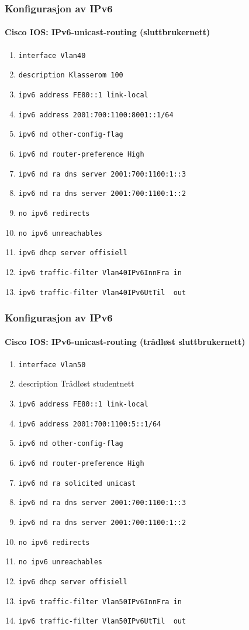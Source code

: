\begin{frame}%
  \frametitle{Konfigurasjon av IPv6}
  \framesubtitle{Cisco IOS: IPv6-unicast-routing (sluttbrukernett)}
  \begin{enumerate}%
  \item \alert{\texttt{interface Vlan40}}
  \item \texttt{description Klasserom 100}
  \item \alert{\texttt{ipv6 address FE80::1 link-local}}
  \item \alert{\texttt{ipv6 address 2001:700:1100:8001::1/64}}
  \item \alert{\texttt{ipv6 nd other-config-flag}}
  \item \alert{\texttt{ipv6 nd router-preference High}}
  \item \alert{\texttt{ipv6 nd ra dns server 2001:700:1100:1::3}}
  \item \alert{\texttt{ipv6 nd ra dns server 2001:700:1100:1::2}}
  \item \alert{\texttt{no ipv6 redirects}}
  \item \alert{\texttt{no ipv6 unreachables}}
  \item \alert{\texttt{ipv6 dhcp server offisiell}}
  \item \alert{\texttt{ipv6 traffic-filter Vlan40IPv6InnFra in}}
  \item \alert{\texttt{ipv6 traffic-filter Vlan40IPv6UtTil\ \ out}}
  \end{enumerate}
\end{frame}

\begin{frame}%
  \frametitle{Konfigurasjon av IPv6}
  \framesubtitle{Cisco IOS: IPv6-unicast-routing (trådløst sluttbrukernett)}
  \begin{enumerate}%
  \item \alert{\texttt{interface Vlan50}}
  \item {description Trådløst studentnett}
  \item {\texttt{ipv6 address FE80::1 link-local}}
  \item {\texttt{ipv6 address 2001:700:1100:5::1/64}}
  \item {\texttt{ipv6 nd other-config-flag}}
  \item {\texttt{ipv6 nd router-preference High}}
  \item \alert{\texttt{ipv6 nd ra solicited unicast}}
  \item {\texttt{ipv6 nd ra dns server 2001:700:1100:1::3}}
  \item {\texttt{ipv6 nd ra dns server 2001:700:1100:1::2}}
  \item {\texttt{no ipv6 redirects}}
  \item {\texttt{no ipv6 unreachables}}
  \item {\texttt{ipv6 dhcp server offisiell}}
  \item {\texttt{ipv6 traffic-filter Vlan50IPv6InnFra in}}
  \item {\texttt{ipv6 traffic-filter Vlan50IPv6UtTil\ \ out}}
  \end{enumerate}
\end{frame}

